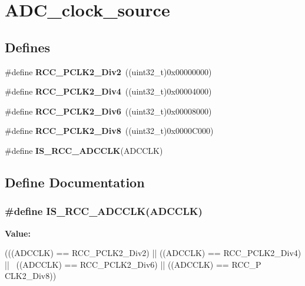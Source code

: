 \hypertarget{group__ADC__clock__source}{
\section{ADC\_\-clock\_\-source}
\label{group__ADC__clock__source}
}
\subsection*{Defines}
\begin{DoxyCompactItemize}
\item 
\hypertarget{group__ADC__clock__source_ga6c341971f2f161320ad150faa3636b41}{
\#define {\bfseries RCC\_\-PCLK2\_\-Div2}~((uint32\_\-t)0x00000000)}
\label{group__ADC__clock__source_ga6c341971f2f161320ad150faa3636b41}

\item 
\hypertarget{group__ADC__clock__source_gaecc7a9370fb7d7772d9c90888792084c}{
\#define {\bfseries RCC\_\-PCLK2\_\-Div4}~((uint32\_\-t)0x00004000)}
\label{group__ADC__clock__source_gaecc7a9370fb7d7772d9c90888792084c}

\item 
\hypertarget{group__ADC__clock__source_gaffb34a845f94f4ea741a45998d28deb3}{
\#define {\bfseries RCC\_\-PCLK2\_\-Div6}~((uint32\_\-t)0x00008000)}
\label{group__ADC__clock__source_gaffb34a845f94f4ea741a45998d28deb3}

\item 
\hypertarget{group__ADC__clock__source_ga77d5c803e2d31a806467bb7db9d24cd0}{
\#define {\bfseries RCC\_\-PCLK2\_\-Div8}~((uint32\_\-t)0x0000C000)}
\label{group__ADC__clock__source_ga77d5c803e2d31a806467bb7db9d24cd0}

\item 
\#define {\bfseries IS\_\-RCC\_\-ADCCLK}(ADCCLK)
\end{DoxyCompactItemize}


\subsection{Define Documentation}
\hypertarget{group__ADC__clock__source_ga6a9c4fb239566f0f3d44c8cc266e528b}{
\subsubsection[{IS\_\-RCC\_\-ADCCLK}]{\setlength{\rightskip}{0pt plus 5cm}\#define IS\_\-RCC\_\-ADCCLK(ADCCLK)}}
\label{group__ADC__clock__source_ga6a9c4fb239566f0f3d44c8cc266e528b}
{\bfseries Value:}
\begin{DoxyCode}
(((ADCCLK) == RCC_PCLK2_Div2) || ((ADCCLK) == RCC_PCLK2_Div4) || \
                               ((ADCCLK) == RCC_PCLK2_Div6) || ((ADCCLK) == RCC_P
      CLK2_Div8))
\end{DoxyCode}
